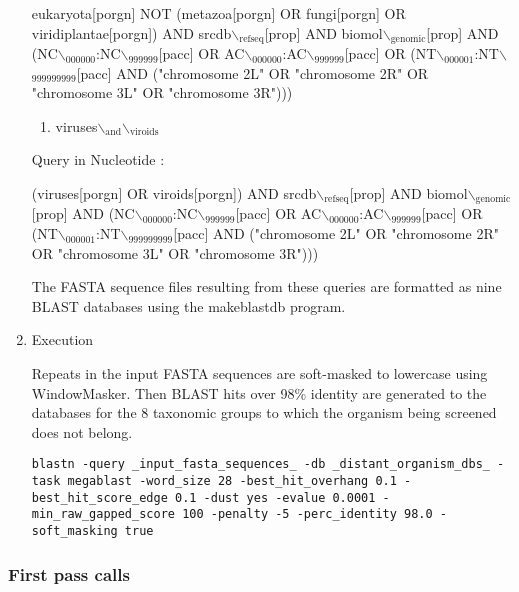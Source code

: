\documentclass[11pt]{article}
\begin{document}
\begin{enumerate}
eukaryota[porgn] NOT (metazoa[porgn] OR fungi[porgn] OR
viridiplantae[porgn]) AND srcdb$\backslash$\(_{\text{refseq}}\)[prop] AND biomol$\backslash$\(_{\text{genomic}}\)[prop]
AND (NC$\backslash$\(_{\text{000000}}\):NC$\backslash$\(_{\text{999999}}\)[pacc] OR AC$\backslash$\(_{\text{000000}}\):AC$\backslash$\(_{\text{999999}}\)[pacc] OR
(NT$\backslash$\(_{\text{000001}}\):NT$\backslash$\(_{\text{999999999}}\)[pacc] AND ("chromosome 2L" OR "chromosome 2R"
OR "chromosome 3L" OR "chromosome 3R")))

\begin{enumerate}
\item viruses$\backslash$\(_{\text{and}}\)$\backslash$\(_{\text{viroids}}\)
\end{enumerate}

Query in Nucleotide :

(viruses[porgn] OR viroids[porgn]) AND srcdb$\backslash$\(_{\text{refseq}}\)[prop] AND
biomol$\backslash$\(_{\text{genomic}}\)[prop] AND (NC$\backslash$\(_{\text{000000}}\):NC$\backslash$\(_{\text{999999}}\)[pacc] OR
AC$\backslash$\(_{\text{000000}}\):AC$\backslash$\(_{\text{999999}}\)[pacc] OR (NT$\backslash$\(_{\text{000001}}\):NT$\backslash$\(_{\text{999999999}}\)[pacc] AND
("chromosome 2L" OR "chromosome 2R" OR "chromosome 3L" OR "chromosome
3R")))

The FASTA sequence files resulting from these queries are formatted as
nine BLAST databases using the makeblastdb program.

\item Execution
\label{sec:org7138237}


Repeats in the input FASTA sequences are soft-masked to lowercase using
WindowMasker. Then BLAST hits over 98\% identity are generated to the
databases for the 8 taxonomic groups to which the organism being
screened does not belong.

\begin{verbatim}
blastn -query _input_fasta_sequences_ -db _distant_organism_dbs_ -task megablast -word_size 28 -best_hit_overhang 0.1 -best_hit_score_edge 0.1 -dust yes -evalue 0.0001 -min_raw_gapped_score 100 -penalty -5 -perc_identity 98.0 -soft_masking true
\end{verbatim}
\end{enumerate}

\subsubsection{First pass calls}
\label{sec:org8f8cb31}
\end{document}
